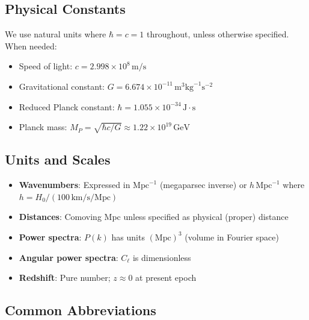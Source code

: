 \subsection{Physical Constants}\label{subsec:notation_constants}

We use natural units where $\hbar = c = 1$ throughout, unless otherwise specified. When needed:

\begin{itemize}
    \item Speed of light: $c = 2.998 \times 10^8 \, \mathrm{m/s}$
    \item Gravitational constant: $G = 6.674 \times 10^{-11} \, \mathrm{m}^3 \mathrm{kg}^{-1} \mathrm{s}^{-2}$
    \item Reduced Planck constant: $\hbar = 1.055 \times 10^{-34} \, \mathrm{J} \cdot \mathrm{s}$
    \item Planck mass: $M_P = \sqrt{\hbar c / G} \approx 1.22 \times 10^{19} \, \mathrm{GeV}$
\end{itemize}

\subsection{Units and Scales}\label{subsec:notation_units}

\begin{itemize}
    \item \textbf{Wavenumbers}: Expressed in $\mathrm{Mpc}^{-1}$ (megaparsec inverse) or $h \, \mathrm{Mpc}^{-1}$ where $h = H_0 / (100 \, \mathrm{km/s/Mpc})$
    \item \textbf{Distances}: Comoving Mpc unless specified as physical (proper) distance
    \item \textbf{Power spectra}: $P(k)$ has units $(\mathrm{Mpc})^3$ (volume in Fourier space)
    \item \textbf{Angular power spectra}: $C_\ell$ is dimensionless
    \item \textbf{Redshift}: Pure number; $z \approx 0$ at present epoch
\end{itemize}

\subsection{Common Abbreviations}\label{subsec:notation_abbrev}

